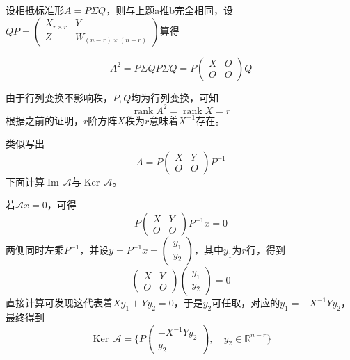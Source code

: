 \documentclass[a4paper,UTF8,fontset=windows]{ctexart}
\DeclareMathOperator{\rank}{rank}
\DeclareMathOperator{\im}{Im\,}
\DeclareMathOperator{\Ker}{Ker\,}
\newcommand*{\ma}{\mathcal{A}}
\begin{document}
\begin{enumerate}
    设相抵标准形$A=P\Sigma Q$，则与上题a推b完全相同，设$QP=\begin{pmatrix}X_{r\times r}&Y\\Z&W_{(n-r)\times(n-r)}\end{pmatrix}$算得

    $$A^2=P\Sigma QP\Sigma Q=P\begin{pmatrix}X&O\\O&O\end{pmatrix}Q$$

    由于行列变换不影响秩，$P,Q$均为行列变换，可知
    $$\rank A^2=\rank X=r$$
    根据之前的证明，$r$阶方阵$X$秩为$r$意味着$X^{-1}$存在。

    类似写出
    $$A=P\begin{pmatrix}X&Y\\O&O\end{pmatrix}P^{-1}$$
    下面计算$\im\ma$与$\Ker\ma$。

    若$\ma x=0$，可得
    $$P\begin{pmatrix}X&Y\\O&O\end{pmatrix}P^{-1}x=0$$
    两侧同时左乘$P^{-1}$，并设$y=P^{-1}x=\begin{pmatrix}y_1\\y_2\end{pmatrix}$，其中$y_1$为$r$行，得到
    $$\begin{pmatrix}X&Y\\O&O\end{pmatrix}\begin{pmatrix}y_1\\y_2\end{pmatrix}=0$$
    直接计算可发现这代表着$Xy_1+Yy_2=0$，于是$y_2$可任取，对应的$y_1=-X^{-1}Yy_2$，最终得到
    $$\Ker\ma=\bigg\{P\begin{pmatrix}-X^{-1}Yy_2\\y_2\end{pmatrix},\quad y_2\in\mathbb{R}^{n-r}\bigg\}$$


\end{enumerate}
\end{document}
